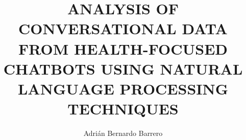 \documentclass[%
    a4paper,                %
    twoside,                %
    12pt,                   %
]{report}                     %
\title{ANALYSIS OF CONVERSATIONAL DATA FROM
HEALTH-FOCUSED CHATBOTS USING NATURAL
LANGUAGE PROCESSING TECHNIQUES}
\author{Adrián Bernardo Barrero}
\begin{document}
\frontmatter

\maketitle
\clearemptydoublepage


\clearemptydoublepage


\clearemptydoublepage

\tableofcontents
\clearemptydoublepage

\listoffigures
\clearemptydoublepage

\listoftables
\clearemptydoublepage

\mainmatter









\backmatter

 
\nocite{*}

\clearemptydoublepage

\appendix

\end{document}
